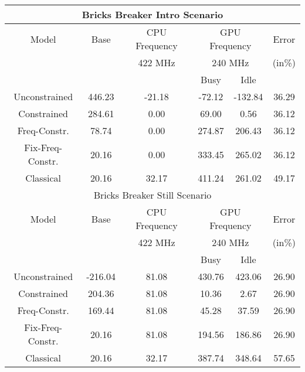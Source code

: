 \begin{table}[]
{\begin{tabular}{|c|c|c|c|c|c|}
    \multicolumn{6}{|c|}{Bricks Breaker Intro Scenario} \\
        \hline
        Model & Base & \multicolumn{1}{c|}{CPU Frequency} & \multicolumn{2}{c|}{GPU Frequency} & Error \\
        \cline{3-5}
        &  & 422 MHz & \multicolumn{2}{c|}{240 MHz} & (in\%) \\
        \cline{3-5}
                & & \multicolumn{1}{|c|}{} & Busy & Idle & \\
        \hline
        Unconstrained & 446.23 & -21.18 & -72.12 & -132.84 & 36.29 \\
        Constrained & 284.61 & 0.00 & 69.00 & 0.56 & 36.12 \\
        Freq-Constr. & 78.74 & 0.00 & 274.87 & 206.43 & 36.12 \\
        Fix-Freq-Constr. & 20.16 & 0.00 & 333.45 & 265.02 & 36.12 \\
        \hline
        Classical & 20.16 & 32.17 & 411.24 & 261.02 & 49.17 \\
        \hline

    \multicolumn{6}{|c|}{Bricks Breaker Still Scenario} \\
        \hline
        Model & Base & \multicolumn{1}{c|}{CPU Frequency} & \multicolumn{2}{c|}{GPU Frequency} & Error \\
        \cline{3-5}
        &  & 422 MHz & \multicolumn{2}{c|}{240 MHz} & (in\%) \\
        \cline{3-5}
                & & \multicolumn{1}{|c|}{} & Busy & Idle & \\
        \hline
        Unconstrained & -216.04 & 81.08 & 430.76 & 423.06 & 26.90 \\
        Constrained & 204.36 & 81.08 & 10.36 & 2.67 & 26.90 \\
        Freq-Constr. & 169.44 & 81.08 & 45.28 & 37.59 & 26.90 \\
        Fix-Freq-Constr. & 20.16 & 81.08 & 194.56 & 186.86 & 26.90 \\
        \hline
        Classical & 20.16 & 32.17 & 387.74 & 348.64 & 57.65 \\
        \hline
\end{tabular}
\label{tab:nexus6nano_a}
}
\vspace{-0.1in}
\end{table}
\fi